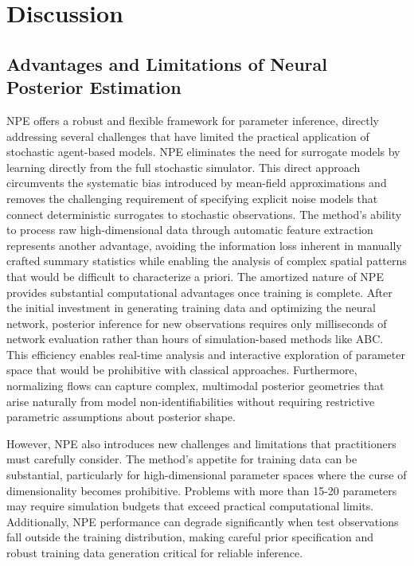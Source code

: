\documentclass{article}
\begin{document}
\section{Discussion}\label{sec:discussion}

\subsection{Advantages and Limitations of Neural Posterior Estimation}

NPE offers a robust and flexible framework for parameter inference, directly addressing several challenges that have limited the practical application of stochastic agent-based models. NPE eliminates the need for surrogate models by learning directly from the full stochastic simulator. This direct approach circumvents the systematic bias introduced by mean-field approximations and removes the challenging requirement of specifying explicit noise models that connect deterministic surrogates to stochastic observations. The method's ability to process raw high-dimensional data through automatic feature extraction represents another advantage, avoiding the information loss inherent in manually crafted summary statistics while enabling the analysis of complex spatial patterns that would be difficult to characterize a priori. The amortized nature of NPE provides substantial computational advantages once training is complete. After the initial investment in generating training data and optimizing the neural network, posterior inference for new observations requires only milliseconds of network evaluation rather than hours of simulation-based methods like ABC. This efficiency enables real-time analysis and interactive exploration of parameter space that would be prohibitive with classical approaches. Furthermore, normalizing flows can capture complex, multimodal posterior geometries that arise naturally from model non-identifiabilities without requiring restrictive parametric assumptions about posterior shape.

However, NPE also introduces new challenges and limitations that practitioners must carefully consider. The method's appetite for training data can be substantial, particularly for high-dimensional parameter spaces where the curse of dimensionality becomes prohibitive. Problems with more than 15-20 parameters may require simulation budgets that exceed practical computational limits. Additionally, NPE performance can degrade significantly when test observations fall outside the training distribution, making careful prior specification and robust training data generation critical for reliable inference.
\end{document}
